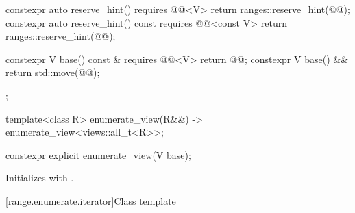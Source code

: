 \begin{codeblock}
{{    constexpr auto reserve_hint() requires @@<V>
    { return ranges::reserve_hint(@@); }
    constexpr auto reserve_hint() const requires @@<const V>
    { return ranges::reserve_hint(@@); }

    constexpr V base() const & requires @@<V> { return @@; }
    constexpr V base() && { return std::move(@@); }
  };

  template<class R>
    enumerate_view(R&&) -> enumerate_view<views::all_t<R>>;
}
\end{codeblock}

%
\begin{itemdecl}
constexpr explicit enumerate_view(V base);
\end{itemdecl}

\begin{itemdescr}
\pnum
\effects
Initializes  with .
\end{itemdescr}

[range.enumerate.iterator]{Class template }

